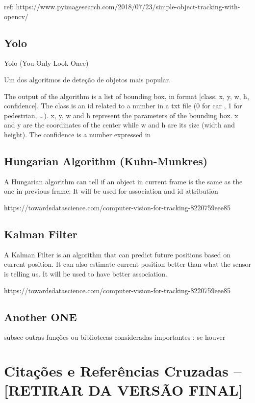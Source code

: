 ref: 
https://www.pyimagesearch.com/2018/07/23/simple-object-tracking-with-opencv/


\subsection{Yolo}
\label{chap2:subsec:yolo}

Yolo (You Only Look Once)

Um dos algoritmos de deteção de objetos mais popular.



The output of the algorithm is a list of bounding box, in format [class, x, y, w, h, confidence]. The class is an id related to a number in a txt file (0 for car , 1 for pedestrian, …). x, y, w and h represent the parameters of the bounding box. x and y are the coordinates of the center while w and h are its size (width and height). The confidence is a number expressed in %



\subsection{Hungarian Algorithm (Kuhn-Munkres)}
\label{chap2:subsec:hungarian}

A Hungarian algorithm can tell if an object in current frame is the same as the one in previous frame. It will be used for association and id attribution

https://towardsdatascience.com/computer-vision-for-tracking-8220759eee85

\subsection{Kalman Filter}
\label{chap2:subsec:kalman}


A Kalman Filter is an algorithm that can predict future positions based on current position. It can also estimate current position better than what the sensor is telling us. It will be used to have better association.

https://towardsdatascience.com/computer-vision-for-tracking-8220759eee85

\subsection{Another ONE}

subsec outras funções ou bibliotecas consideradas importantes : se houver


\section{Citações e Referências Cruzadas -- [RETIRAR DA VERSÃO FINAL]}
\label{chap2:sec:citacoes}


